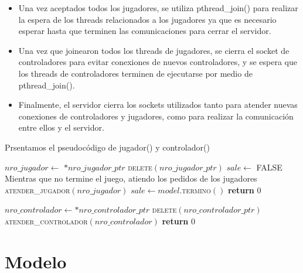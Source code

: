 \documentclass[a4paper,10pt,twoside]{article}
\newenvironment{pseudo}[1][]{%
    \vspace{0.5em}%
    \begin{algorithmic}%
}
{%
    \end{algorithmic}%
    \vspace{0.5em}%
}
\newcommand{\Fn}[2]{\textsc{#1}$(#2)$}
\newcommand{\PReturn}[1]{\textbf{return} $#1$}
\newcommand{\PNot}{\textbf{not} }
\newcommand{\PTrue}{\textnormal{TRUE} }
\newcommand{\PFalse}{\textnormal{FALSE} }
\begin{document}
\begin{itemize}
    \item Una vez aceptados todos los jugadores, se utiliza pthread\_join() para realizar la espera de los threads relacionados a los jugadores ya que es necesario esperar hasta que terminen las comunicaciones para cerrar el servidor.
    
    \item Una vez que joinearon todos los threads de jugadores, se cierra el socket de controladores para evitar conexiones de nuevos controladores, y se espera que los threads de controladores terminen de ejecutarse por medio de pthread\_join().

    \item Finalmente, el servidor cierra los sockets utilizados tanto para atender nuevas conexiones de controladores y jugadores, como para realizar la comunicación entre ellos y el servidor.
\end{itemize}

Prsentamos el pseudocódigo de jugador() y controlador()

\begin{pseudo}
        \State $nro\_jugador \leftarrow$ $*nro\_jugador\_ptr$
        \State \Fn{delete}{nro\_jugador\_ptr}
        \State $sale \leftarrow$ \PFalse
        \State
        \State Mientras que no termine el juego, atiendo los pedidos de los jugadores
        \State
        \While{\PNot $sale$}
            \State \Fn{atender\_jugador}{nro\_jugador}
            \State $sale \leftarrow model.$\Fn{termino}{}
        \EndWhile
        \State \PReturn{0}
    \EndProcedure
\end{pseudo}

\begin{pseudo}
        \State $nro\_controlador \leftarrow *nro\_controlador\_ptr$
        \State \Fn{delete}{nro\_controlador\_ptr}
        \While{\PTrue}
            \State \Fn{atender\_controlador}{nro\_controlador}
        \EndWhile
        \State \PReturn{0}
    \EndProcedure
\end{pseudo}




\section{Modelo}
\end{document}
